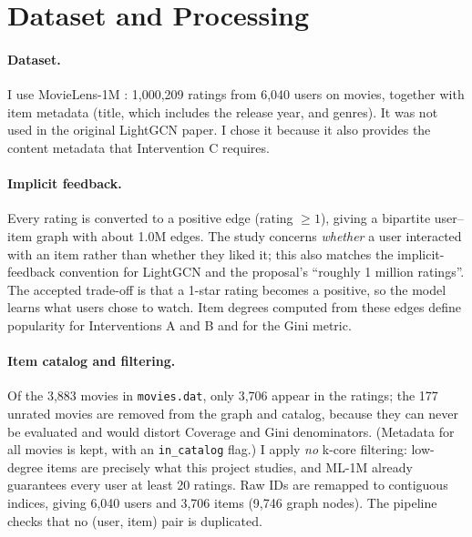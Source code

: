 \documentclass{article}
\begin{document}
\section{Dataset and Processing}

\paragraph{Dataset.} I use MovieLens-1M \citep{harper2015movielens}: 1,000,209 ratings from 6,040 users on movies, together with item metadata (title, which includes the release year, and genres). It was not used in the original LightGCN paper. I chose it because it also provides the content metadata that Intervention C requires.

\paragraph{Implicit feedback.} Every rating is converted to a positive edge (rating $\geq 1$), giving a bipartite user--item graph with about 1.0M edges. The study concerns \emph{whether} a user interacted with an item rather than whether they liked it; this also matches the implicit-feedback convention for LightGCN and the proposal's ``roughly 1 million ratings''. The accepted trade-off is that a 1-star rating becomes a positive, so the model learns what users chose to watch. Item degrees computed from these edges define popularity for Interventions A and B and for the Gini metric.

\paragraph{Item catalog and filtering.} Of the 3,883 movies in \texttt{movies.dat}, only 3,706 appear in the ratings; the 177 unrated movies are removed from the graph and catalog, because they can never be evaluated and would distort Coverage and Gini denominators. (Metadata for all movies is kept, with an \texttt{in\_catalog} flag.) I apply \emph{no} k-core filtering: low-degree items are precisely what this project studies, and ML-1M already guarantees every user at least 20 ratings. Raw IDs are remapped to contiguous indices, giving 6,040 users and 3,706 items (9,746 graph nodes). The pipeline checks that no (user, item) pair is duplicated.
\end{document}
